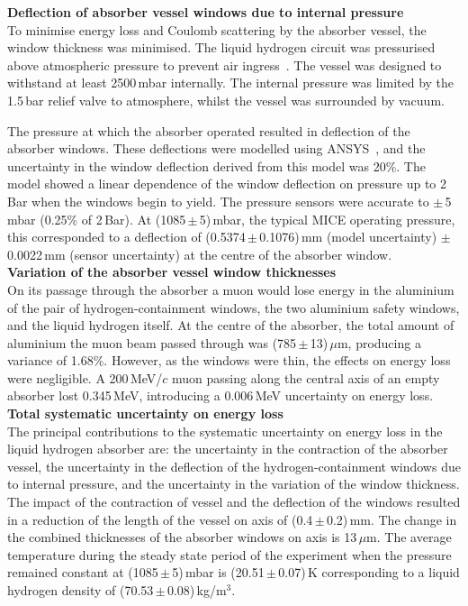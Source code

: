 \noindent\textbf{Deflection of absorber vessel windows due to internal
  pressure} \\
\noindent
To minimise energy loss and Coulomb scattering by the absorber vessel,
the window thickness was minimised.
The liquid hydrogen circuit was pressurised
above atmospheric pressure to prevent air ingress~\cite{1748-0221-13-09-T09008,Ishimoto}. 
The vessel was designed to withstand at least 2500\,mbar internally.
The internal pressure was limited by the 1.5\,bar relief valve to atmosphere, whilst the vessel was surrounded by vacuum.

The pressure at which the absorber operated resulted in deflection of the absorber windows. These
deflections were modelled using ANSYS~\cite{NOTE155}, and the uncertainty in the
window deflection derived from this model was 20\%.
The model showed a linear dependence of the window deflection on
pressure up to 2\,Bar when the windows begin to yield.
The pressure sensors were accurate to $\mathrm{\pm}$\,5\,mbar
(0.25\% of 2\,Bar).
At (1085\,$\mathrm{\pm}$\,5)\,mbar, the typical MICE operating
pressure, this corresponded to a deflection of
(0.5374\,$\mathrm{\pm}$\,0.1076)\,mm (model uncertainty)
$\mathrm{\pm}$\,0.0022\,mm (sensor uncertainty) at the centre of the
absorber window. \\

\noindent\textbf{Variation of the absorber vessel window thicknesses} \\
\noindent
On its passage through the absorber a muon would lose energy in the
aluminium of the pair of hydrogen-containment windows, the two
aluminium safety windows, and the liquid hydrogen itself.
At the centre of the absorber, the total amount of aluminium the muon
beam passed through was (785\,$\mathrm{\pm}$\,13)\,$\mu$m, producing a variance
of 1.68\%.
However, as the windows were thin, the effects on energy loss were
negligible.
A 200\,MeV/$c$ muon passing along the central axis of an empty
absorber lost 0.345\,MeV, introducing a 0.006\,MeV uncertainty
on energy loss.  \\

\noindent\textbf{Total systematic uncertainty on energy loss} \\
\noindent
The principal contributions to the systematic uncertainty on energy
loss in the liquid hydrogen absorber are: the uncertainty in the
contraction of the absorber vessel, the uncertainty in the deflection
of the hydrogen-containment windows due to internal pressure, and the
uncertainty in the variation of the window thickness.
The impact of the contraction of vessel and the deflection of the
windows resulted in a reduction of the length of the vessel on
axis of (0.4\,$\mathrm{\pm}$\,0.2)\,mm.
The change in the combined thicknesses of the absorber
windows on axis is 13\,$\mu$m.
The average temperature during the steady state period of the
experiment when the pressure remained constant at
(1085\,$\mathrm{\pm}$\,5)\,mbar is (20.51\,$\mathrm{\pm}$\,0.07)\,K 
corresponding to a liquid hydrogen density of (70.53\,$\mathrm{\pm}$\,0.08)\,kg/m$^{3}$.

